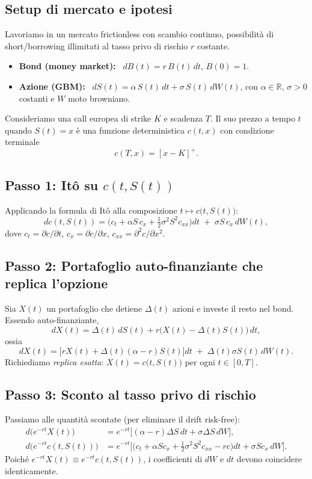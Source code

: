 \documentclass[12pt,a4paper]{book}
\theoremstyle{remark}
\begin{document}
\subsection{Setup di mercato e ipotesi}
Lavoriamo in un mercato frictionless con scambio continuo, possibilità di short/borrowing illimitati al tasso privo di rischio $r$ costante.
\begin{itemize}
  \item \textbf{Bond (money market):} \ $dB(t)=r\,B(t)\,dt$, $B(0)=1$.
  \item \textbf{Azione (GBM):} \ $dS(t)=\alpha\,S(t)\,dt+\sigma\,S(t)\,dW(t)$, con $\alpha\in\mathbb{R}$, $\sigma>0$ costanti e $W$ moto browniano.
\end{itemize}
Consideriamo una call europea di strike $K$ e scadenza $T$. Il suo prezzo a tempo $t$ quando $S(t)=x$ è una funzione deterministica $c(t,x)$ con condizione terminale
\[
c(T,x) = [x-K]^+.
\]

\subsection*{Passo 1: It\^o su $c(t,S(t))$}
Applicando la formula di It\^o alla composizione $t\mapsto c\big(t,S(t)\big)$:
\[
dc(t,S(t))
= \Big( c_t + \alpha S\,c_x + \tfrac12 \sigma^2 S^2 c_{xx} \Big) dt
\;+\; \sigma S\,c_x\, dW(t),
\]
dove $c_t=\partial c/\partial t$, $c_x=\partial c/\partial x$, $c_{xx}=\partial^2 c/\partial x^2$.

\subsection*{Passo 2: Portafoglio auto-finanziante che replica l'opzione}
Sia $X(t)$ un portafoglio che detiene $\Delta(t)$ azioni e investe il resto nel bond. Essendo auto-finanziante,
\[
dX(t)=\Delta(t)\,dS(t) + r\big(X(t)-\Delta(t)S(t)\big)\,dt,
\]
ossia
\[
dX(t) = \big[rX(t)+\Delta(t)(\alpha-r)S(t)\big]dt \;+\; \Delta(t)\sigma S(t)\,dW(t).
\]
Richiediamo \emph{replica esatta}: $X(t)=c\big(t,S(t)\big)$ per ogni $t\in[0,T]$.

\subsection*{Passo 3: Sconto al tasso privo di rischio}
Passiamo alle quantità scontate (per eliminare il drift risk-free):
\[
\begin{aligned}
d\!\big(e^{-rt}X(t)\big) &= e^{-rt}\big[(\alpha-r)\Delta S\,dt + \sigma \Delta S\,dW\big],\\
d\!\big(e^{-rt}c(t,S(t))\big) &= e^{-rt}\Big[\big(c_t+\alpha S c_x+\tfrac12\sigma^2 S^2 c_{xx}-r c\big)dt
+ \sigma S c_x\,dW\Big].
\end{aligned}
\]
Poich\'e $e^{-rt}X(t)\equiv e^{-rt}c(t,S(t))$, i coefficienti di $dW$ e $dt$ devono coincidere identicamente.
\end{document}
